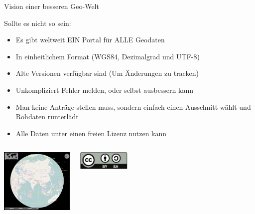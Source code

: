 \documentclass{beamer}
\begin{document}
\begin{frame}{Vision einer besseren Geo-Welt}

 Sollte es nicht so sein:
  \begin{itemize}
    \item Es gibt weltweit EIN Portal für ALLE Geodaten 
    \item In einheitlichem Format (WGS84, Dezimalgrad und UTF-8)
    \item Alte Versionen verfügbar sind (Um Änderungen zu tracken)
    \item Unkompliziert Fehler melden, oder selbst ausbessern kann
\pause
    \item Man keine Anträge stellen muss, sondern einfach einen Ausschnitt wählt und Rohdaten runterlädt
    \item Alle Daten unter einen freien Lizenz nutzen kann
  \end{itemize}

  \begin{columns}[c]
        \begin{center}
  \includegraphics[width=3.5cm]{marble.png}
  \end{center}
      \begin{center}
    \includegraphics[width=2.5cm]{cc-by-sa.pdf}
  \end{center}
\end{columns}

\end{frame}
\end{document}
